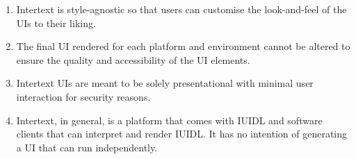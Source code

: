 \begin{enumerate}
  \item Intertext is style-agnostic so that users can customise the look-and-feel of the UIs to their liking.
  \item The final UI rendered for each platform and environment cannot be altered to ensure the quality and accessibility of the UI elements.
  \item Intertext UIs are meant to be solely presentational with minimal user interaction for security reasons.
  \item Intertext, in general, is a platform that comes with IUIDL and software clients that can interpret and render IUIDL. It has no intention of generating a UI that can run independently.
\end{enumerate}
